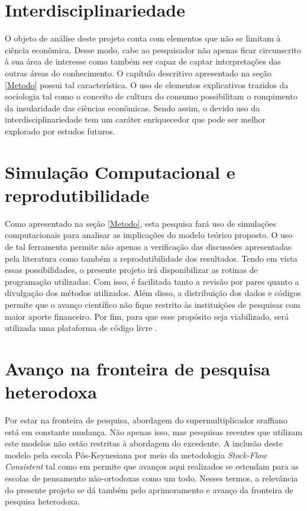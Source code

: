 \section{Interdisciplinariedade}
O objeto de análise deste projeto conta com elementos que não se limitam à ciência econômica. Desse modo, cabe ao pesquisador não apenas ficar circunscrito à sua área de interesse como também ser capaz de captar interpretações das outras áreas do conhecimento. O capítulo descritivo apresentado na seção \ref{Metodo} possui tal característica. O uso de elementos explicativos trazidos da sociologia tal como o conceito de cultura do consumo \cites{isleide_a._fontenelle_alcances_2016}{streeck_citizens_nodate} possibilitam o rompimento da insularidade das ciências econômicas. Sendo assim, o devido uso da interdisciplinariedade tem um caráter enriquecedor que pode ser melhor explorado por estudos futuros.

\section{Simulação Computacional e reprodutibilidade}
Como apresentado na seção \ref{Metodo}, esta pesquisa fará uso de simulações computacionais para analisar as implicações do modelo teórico proposto. O uso de tal ferramenta permite não apenas a verificação das discussões apresentadas pela literatura como também a reprodutibilidade dos resultados. Tendo em vista essas possibilidades, o presente projeto irá disponibilizar as rotinas de programação utilizadas. Com isso, é facilitada tanto a revisão por pares quanto a divulgação dos métodos utilizados. Além disso, a distribuição dos dados e códigos permite que o avanço científico não fique restrito às instituições de pesquisas com maior aporte financeiro. Por fim, para que esse propósito seja viabilizado, será utilizada uma plataforma de código livre \cite{center_for_open_science_osfhome_nodate}.

\section{Avanço na fronteira de pesquisa heterodoxa}

Por estar na fronteira de pesquisa, abordagem do supermultiplicador sraffiano está em constante mudança. Não apenas isso, mas pesquisas recentes que utilizam este modelos não estão restritas à abordagem do excedente. A inclusão deste modelo pela escola Pós-Keynesiana por meio da metodologia \textit{Stock-Flow Consistent} tal como em \textcite{brochier_endogenous_2018}
permite que avanços aqui realizados se estendam para as escolas de pensamento não-ortodoxas como um todo. Nesses termos, a relevância do presente projeto se dá também pelo aprimoramento e avanço da fronteira de pesquisa heterodoxa.





